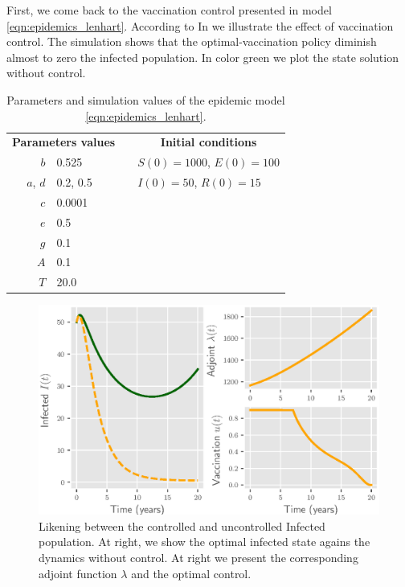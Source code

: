 First, we come back to the vaccination control presented in model
\eqref{eqn:epidemics_lenhart}. According to 
In  we illustrate the effect of vaccination 
control. The simulation shows that the optimal-vaccination policy diminish
almost to zero the infected population. In color green we plot the state 
solution without control.
\begin{table}[H]
  \begin{center}
    \begin{tabular}{rlll}
      \toprule
      \multicolumn{2}{c}{
            \textbf{Parameters values}
         }
        && \multicolumn{1}{c}{
          \textbf{Initial conditions}
        }
        \\
        \cmidrule{1-2}
        \cmidrule{4-4}
        $b$
          & \num{0.525}
          &&
          $S(0) = \num{1000}$, $E(0) = \num{100}$
        \\
        $a$, $d$ 
          & \num{0.2}, \num{0.5}
          &&
          $I(0) = \num{50}$, $R(0) = \num{15}$
        \\
        $c$
          & \num{0.0001}
        \\
        $e$
          & \num{0.5}
        \\
        $g$
          & \num{0.1}
        \\
        $A$
          & \num{0.1}
        \\
        $T$
          & \num{20.0}
        \\
      \bottomrule
    \end{tabular}
    \caption{Parameters and simulation values of the epidemic model
      \eqref{eqn:epidemics_lenhart}.}
    \label{tbl:epidemics_lenhart}
  \end{center}
\end{table}

\begin{figure}[H]
\centering
	\includegraphics{./Figures/epidemics_lenhart_lab7}
	\caption{Likening between the controlled and uncontrolled Infected 
	 population.  At right, we show the optimal infected state agains the 
	 dynamics without 
	 control. At right we present the corresponding adjoint function $\lambda$ 
	 and the optimal control.}
\label{fig:epidemicslenhartlab7}
\end{figure}
